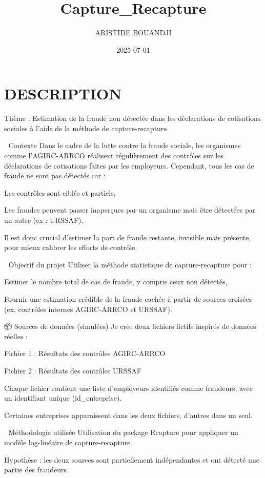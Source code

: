 \documentclass[
]{article}
\title{Capture\_Recapture}
\author{ARISTIDE BOUANDJI}
\date{2025-07-01}
\begin{document}
\maketitle

\section{DESCRIPTION}\label{description}

Thème : Estimation de la fraude non détectée dans les déclarations de
cotisations sociales à l'aide de la méthode de capture-recapture.

🧩 Contexte Dans le cadre de la lutte contre la fraude sociale, les
organismes comme l'AGIRC-ARRCO réalisent régulièrement des contrôles sur
les déclarations de cotisations faites par les employeurs. Cependant,
tous les cas de fraude ne sont pas détectés car :

Les contrôles sont ciblés et partiels,

Les fraudes peuvent passer inaperçues par un organisme mais être
détectées par un autre (ex : URSSAF).

Il est donc crucial d'estimer la part de fraude restante, invisible mais
présente, pour mieux calibrer les efforts de contrôle.

🎯 Objectif du projet Utiliser la méthode statistique de
capture-recapture pour :

Estimer le nombre total de cas de fraude, y compris ceux non détectés,

Fournir une estimation crédible de la fraude cachée à partir de sources
croisées (ex. contrôles internes AGIRC-ARRCO et URSSAF).

📦 Sources de données (simulées) Je crée deux fichiers fictifs inspirés
de données réelles :

Fichier 1 : Résultats des contrôles AGIRC-ARRCO

Fichier 2 : Résultats des contrôles URSSAF

Chaque fichier contient une liste d'employeurs identifiés comme
fraudeurs, avec un identifiant unique (id\_entreprise).

Certaines entreprises apparaissent dans les deux fichiers, d'autres dans
un seul.

🧠 Méthodologie utilisée Utilisation du package Rcapture pour appliquer
un modèle log-linéaire de capture-recapture.

Hypothèse : les deux sources sont partiellement indépendantes et ont
détecté une partie des fraudeurs.
\end{document}
